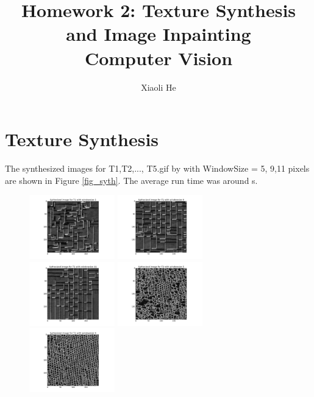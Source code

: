\documentclass{extarticle}
\theoremstyle{definition}
\theoremstyle{definition}
\begin{document}
\title{Homework 2: Texture Synthesis and Image Inpainting \\
	Computer Vision}
\author{Xiaoli He}
\maketitle
\newpage

\section{Texture Synthesis}
The synthesized images for T1,T2,..., T5.gif by with WindowSize = 5, 9,11 pixels are shown in Figure \ref{fig_syth}. The average run time was around s.\\
\begin{figure}[H]
	\includegraphics[width = 0.33\textwidth]{./figures/Syth_T1_size_5.png}
	\includegraphics[width = 0.33\textwidth]{./figures/Syth_T1_size_9.png}
	\includegraphics[width = 0.33\textwidth]{./figures/Syth_T1_size_11.png}
	\includegraphics[width = 0.33\textwidth]{./figures/Syth_T2_size_5.png}
	\includegraphics[width = 0.33\textwidth]{./figures/Syth_T2_size_9.png}

\end{figure}
\end{document}
